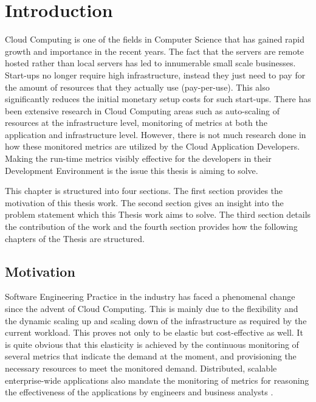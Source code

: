 \documentclass[article,type=msc,colorback,12pt,accentcolor=tud7b]{tudthesis}
\begin{document}
\clearpage

\setlength{ \parskip }{1em}
\tableofcontents 
\cleardoublepage 

\listoffigures
\clearpage
\appendix
\cleardoublepage 

 \section{Introduction}
	
	Cloud Computing is one of the fields in Computer Science that has gained rapid growth and importance in the recent years. The fact that the servers are remote hosted rather than local servers has led to innumerable small scale businesses. Start-ups no longer require high infrastructure, instead they just need to pay for the amount of resources that they actually use (pay-per-use). This also significantly reduces the initial monetary setup costs for such start-ups. There has been extensive research in Cloud Computing areas such as auto-scaling of resources at the infrastructure level, monitoring of metrics at both the application and infrastructure level. However, there is not much research done in how these monitored metrics are utilized by the Cloud Application Developers. Making the run-time metrics visibly effective for the developers in their Development Environment is the issue this thesis is aiming to solve.
	\par This chapter is structured into four sections. The first section provides the motivation of this thesis work. The second section gives an insight into the problem statement which this Thesis work aims to solve. The third section details the contribution of the work and the fourth section provides how the following chapters of the Thesis are structured.
	
	\subsection{Motivation}
	
	Software Engineering Practice in the industry has faced a phenomenal change since the advent of Cloud Computing. This is mainly due to the flexibility and the dynamic scaling up and scaling down of the infrastructure as required by the current workload. This proves not only to be elastic but cost-effective as well. It is quite obvious that this elasticity is achieved by the continuous monitoring of several metrics that indicate the demand at the moment, and provisioning the necessary resources to meet the monitored demand. Distributed, scalable enterprise-wide applications also mandate the monitoring of metrics for reasoning the effectiveness of the applications by engineers and business analysts \cite{leitner2012application}.
	
\end{document}
